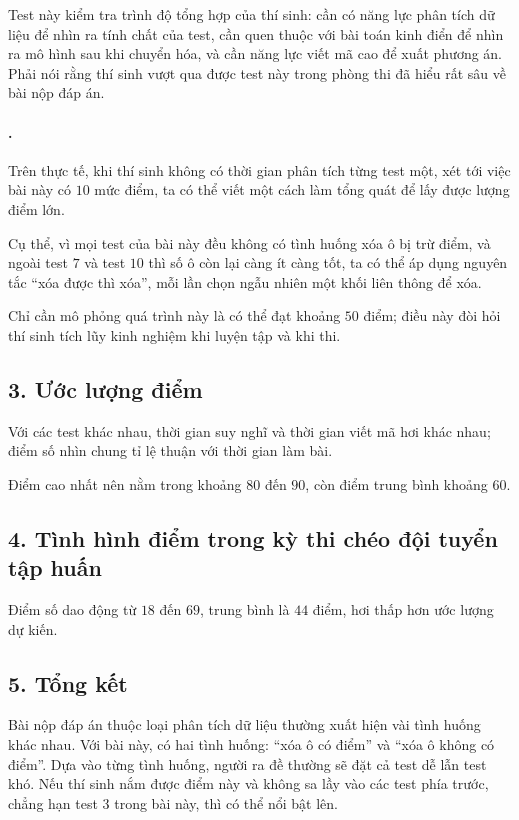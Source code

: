 \documentclass[11pt]{article}
\begin{document}
Test này kiểm tra trình độ tổng hợp của thí sinh: cần có năng lực phân tích dữ
liệu để nhìn ra tính chất của test, cần quen thuộc với bài toán kinh điển để
nhìn ra mô hình sau khi chuyển hóa, và cần năng lực viết mã cao để xuất phương
án. Phải nói rằng thí sinh vượt qua được test này trong phòng thi đã hiểu rất
sâu về bài nộp đáp án.

\paragraph{.}
Trên thực tế, khi thí sinh không có thời gian phân tích từng test một, xét tới
việc bài này có \(10\) mức điểm, ta có thể viết một cách làm tổng quát để lấy
được lượng điểm lớn.

Cụ thể, vì mọi test của bài này đều không có tình huống xóa ô bị trừ điểm, và
ngoài test \(7\) và test \(10\) thì số ô còn lại càng ít càng tốt, ta có thể
áp dụng nguyên tắc ``xóa được thì xóa'', mỗi lần chọn ngẫu nhiên một khối liên
thông để xóa.

Chỉ cần mô phỏng quá trình này là có thể đạt khoảng \(50\) điểm; điều này đòi
hỏi thí sinh tích lũy kinh nghiệm khi luyện tập và khi thi.

\subsection*{3. Ước lượng điểm}

Với các test khác nhau, thời gian suy nghĩ và thời gian viết mã hơi khác
nhau; điểm số nhìn chung tỉ lệ thuận với thời gian làm bài.

Điểm cao nhất nên nằm trong khoảng \(80\) đến \(90\), còn điểm trung bình
khoảng \(60\).

\subsection*{4. Tình hình điểm trong kỳ thi chéo đội tuyển tập huấn}

Điểm số dao động từ \(18\) đến \(69\), trung bình là \(44\) điểm, hơi thấp hơn
ước lượng dự kiến.

\subsection*{5. Tổng kết}

Bài nộp đáp án thuộc loại phân tích dữ liệu thường xuất hiện vài tình huống
khác nhau. Với bài này, có hai tình huống: ``xóa ô có điểm'' và ``xóa ô không
có điểm''. Dựa vào từng tình huống, người ra đề thường sẽ đặt cả test dễ lẫn
test khó. Nếu thí sinh nắm được điểm này và không sa lầy vào các test phía
trước, chẳng hạn test \(3\) trong bài này, thì có thể nổi bật lên.
\end{document}
